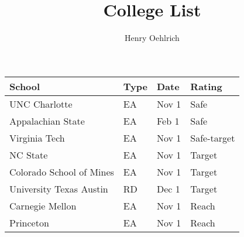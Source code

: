 \documentclass{article}
\title{College List}
\author{Henry Oehlrich}
\begin{document}
\maketitle
\centering
\begin{tabular}{p{5cm}p{1cm}p{1.5cm}p{2.5cm}}
    \toprule
    School & Type & Date & Rating \\
    \midrule
    UNC Charlotte & EA & Nov 1 & Safe \\
    Appalachian State & EA & Feb 1 & Safe \\
    Virginia Tech & EA & Nov 1 & Safe-target \\
    NC State & EA & Nov 1 & Target \\
    Colorado School of Mines & EA & Nov 1 & Target \\
    University Texas Austin & RD & Dec 1 & Target \\
    Carnegie Mellon & EA & Nov 1 & Reach \\
    Princeton & EA & Nov 1 & Reach \\
    \bottomrule
\end{tabular}
\end{document}
